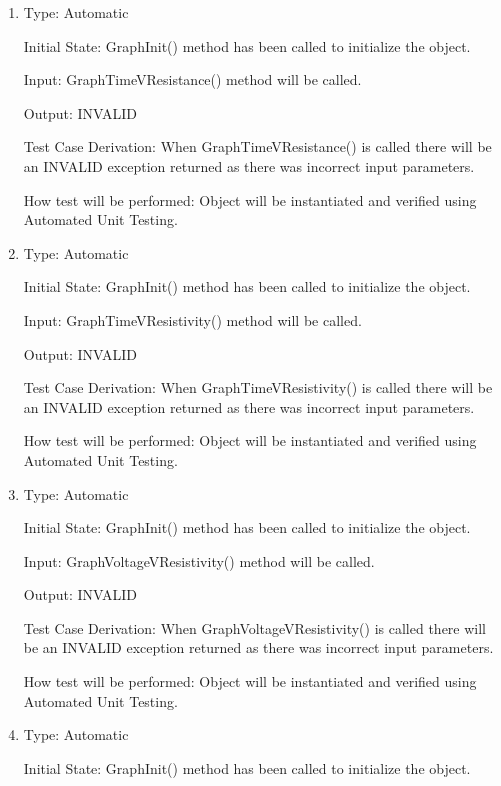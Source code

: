 \documentclass[12pt, titlepage]{article}
\begin{document}
\begin{enumerate}[{UT-GO}1.]

\item

Type: Automatic
					
Initial State: GraphInit() method has been called to initialize the object.
					
Input: GraphTimeVResistance() method will be called.
					
Output: INVALID

Test Case Derivation: When GraphTimeVResistance() is called there will be an INVALID exception returned as there was incorrect input parameters.

How test will be performed: Object will be instantiated and verified using Automated Unit Testing.
					
\item

Type: Automatic
					
Initial State: GraphInit() method has been called to initialize the object.
					
Input: GraphTimeVResistivity() method will be called.
					
Output: INVALID

Test Case Derivation: When GraphTimeVResistivity() is called there will be an INVALID exception returned as there was incorrect input parameters.

How test will be performed: Object will be instantiated and verified using Automated Unit Testing.

\item

Type: Automatic
					
Initial State: GraphInit() method has been called to initialize the object.
					
Input: GraphVoltageVResistivity() method will be called.
					
Output: INVALID

Test Case Derivation: When GraphVoltageVResistivity() is called there will be an INVALID exception returned as there was incorrect input parameters.

How test will be performed: Object will be instantiated and verified using Automated Unit Testing.

\item

Type: Automatic
					
Initial State: GraphInit() method has been called to initialize the object.
					

\end{enumerate}
\end{document}
